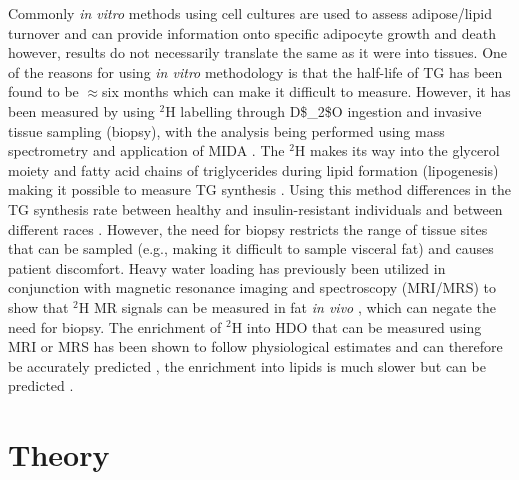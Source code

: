 Commonly \textit{in vitro} methods using cell cultures are used to assess adipose/lipid turnover and can provide information onto specific adipocyte growth and death \cite{Tchkonia2002FatPreadipocytes} however, results do not necessarily translate the same as it were into tissues. One of the reasons for using \textit{in vitro} methodology is that the half-life of \ac{TG} has been found to be $\approx$six months \cite{Strawford2004AdiposeO} which can make it difficult to measure. However, it has been measured by using $^2$H labelling through \ac{D$_2$O} ingestion and invasive tissue sampling (biopsy), with the analysis being performed using mass spectrometry and application of \ac{MIDA} \cite{White2019DynamicsDisease, Strawford2004AdiposeO, Belew2022DeTracers, Turner2003MeasurementMIDA}. The $^2$H makes its way into the glycerol moiety and fatty acid chains of triglycerides during lipid formation (lipogenesis) making it possible to measure TG synthesis \cite{Turner2003MeasurementMIDA}. Using this method differences in the \ac{TG} synthesis rate between healthy and insulin-resistant individuals \cite{Allister2015InHumans} and between different races \cite{White2018RacialHumans}. However, the need for biopsy restricts the range of tissue sites that can be sampled (e.g., making it difficult to sample visceral fat) and causes patient discomfort. Heavy water loading has previously been utilized in conjunction with magnetic resonance imaging and spectroscopy (\ac{MRI}/\ac{MRS}) to show that $^2$H MR signals can be measured in fat \textit{in vivo} \cite{Brereton1989TheMice, Cocking2023DeuteriumDosing}, which can negate the need for biopsy. The enrichment of $^2$H into \ac{HDO} that can be measured using \ac{MRI} or \ac{MRS} has been shown to follow physiological estimates and can therefore be accurately predicted \cite{Cocking2023DeuteriumDosing}, the enrichment into lipids is much slower \cite{White2019DynamicsDisease, Strawford2004AdiposeO} but can be predicted \cite{White2019DynamicsDisease}.

\section{Theory}


